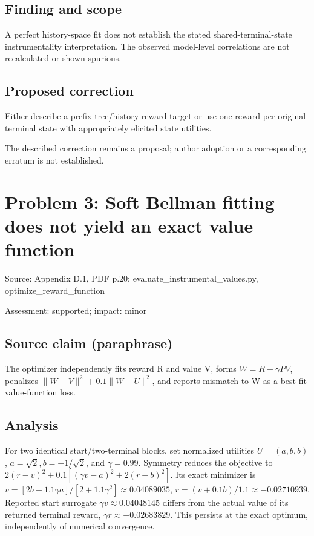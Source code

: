 \documentclass[11pt]{article}
\begin{document}
\subsection*{Finding and scope}

A perfect history-space fit does not establish the stated shared-terminal-state instrumentality interpretation. The observed model-level correlations are not recalculated or shown spurious.

\subsection*{Proposed correction}

Either describe a prefix-tree/history-reward target or use one reward per original terminal state with appropriately elicited state utilities.

The described correction remains a proposal; author adoption or a corresponding erratum is not established.

\section*{Problem 3: Soft Bellman fitting does not yield an exact value function}

Source: Appendix D.1, PDF p.20; evaluate\_instrumental\_values.py, optimize\_reward\_function

Assessment: supported; impact: minor

\subsection*{Source claim (paraphrase)}

The optimizer independently fits reward R and value V, forms \(W=R+\gamma PV\), penalizes \(\|W-V\|^2+0.1\|W-U\|^2\), and reports mismatch to W as a best-fit value-function loss.

\subsection*{Analysis}

For two identical start/two-terminal blocks, set normalized utilities \(U=(a,b,b)\), \(a=\sqrt2,b=-1/\sqrt2\), and \(\gamma=0.99\). Symmetry reduces the objective to \(2(r-v)^2+0.1[(\gamma v-a)^2+2(r-b)^2]\). Its exact minimizer is \(v=[2b+1.1\gamma a]/[2+1.1\gamma^2]\approx0.04089035\), \(r=(v+0.1b)/1.1\approx-0.02710939\). Reported start surrogate \(\gamma v\approx0.04048145\) differs from the actual value of its returned terminal reward, \(\gamma r\approx-0.02683829\). This persists at the exact optimum, independently of numerical convergence.
\end{document}
